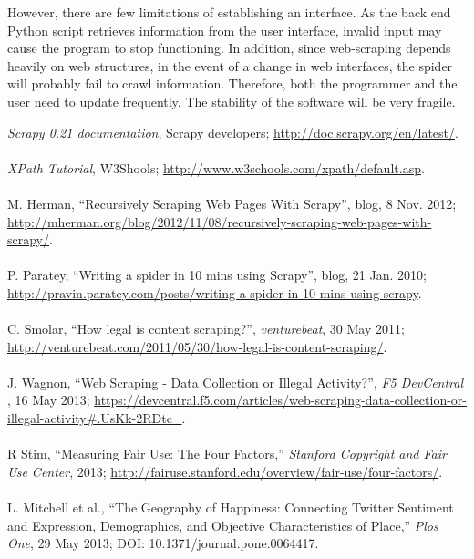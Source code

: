 \documentclass[12pt]{report}
\begin{document}
However, there are few limitations of establishing an interface. As the back end Python script retrieves information from the user interface, invalid input may cause the program to stop functioning. In addition, since web-scraping depends heavily on web structures, in the event of a change in web interfaces, the spider will probably fail to crawl information. Therefore, both the programmer and the user need to update frequently. The stability of the software will be very fragile.

\newpage
\begin{appendices}
\printglossaries
\end{appendices}
\begin{thebibliography}{9}

\textit{Scrapy 0.21 documentation}, Scrapy developers; \url{http://doc.scrapy.org/en/latest/}.\\\\

\textit{XPath Tutorial}, W3Shools; \url{http://www.w3schools.com/xpath/default.asp}.\\\\

M. Herman, ``Recursively Scraping Web Pages With Scrapy'', blog, 8 Nov. 2012; \url{http://mherman.org/blog/2012/11/08/recursively-scraping-web-pages-with-scrapy/}.\\\\

P. Paratey, ``Writing a spider in 10 mins using Scrapy'', blog, 21 Jan. 2010; \url{http://pravin.paratey.com/posts/writing-a-spider-in-10-mins-using-scrapy}.\\\\

C. Smolar, ``How legal is content scraping?'', \textit{venturebeat}, 30 May 2011; \url{http://venturebeat.com/2011/05/30/how-legal-is-content-scraping/}.\\\\

J. Wagnon, ``Web Scraping - Data Collection or Illegal Activity?'', \textit{F5 DevCentral }, 16 May 2013; \url{https://devcentral.f5.com/articles/web-scraping-data-collection-or-illegal-activity#.UsKk-2RDtc_}.\\\\

R Stim, ``Measuring Fair Use: The Four Factors,'' \textit{Stanford Copyright and Fair Use Center}, 2013; \url{http://fairuse.stanford.edu/overview/fair-use/four-factors/}. \\\\

L. Mitchell et al., ``The Geography of Happiness: Connecting Twitter Sentiment and Expression, Demographics, and Objective Characteristics of Place,'' \textit{Plos One}, 29 May 2013; DOI: 10.1371/journal.pone.0064417. \\\\

\end{thebibliography}
\end{document}

